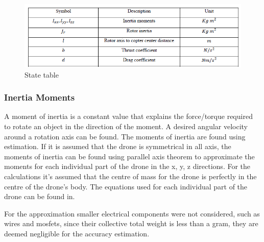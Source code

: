 \begin{figure}[H]
\begin{center}
    \includegraphics[scale =0.9]{pictures/control/parameter table.png}
\end{center}
\caption{State table}
\end{figure}

\subsubsection{Inertia Moments}
A moment of inertia is a constant value that explains the force/torque required to rotate an object in the direction of the moment. A desired angular velocity around a rotation axis can be found. The moments of inertia are found using estimation. If it is assumed that the drone is symmetrical in all axis, the moments of inertia can be found using parallel axis theorem to approximate the moments for each individual part of the drone in the x, y, z directions. For the calculations it’s assumed that the centre of mass for the drone is perfectly in the centre of the drone’s body.
The equations used for each individual part of the drone can be found in. \cite{Ferry}

For the approximation smaller electrical components were not considered, such as wires and mosfets, since their collective total weight is less than a gram, they are deemed negligible for the accuracy estimation.

